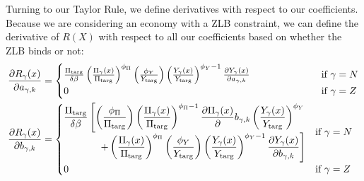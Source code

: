 \documentclass[11pt]{article}
\begin{document}
Turning to our Taylor Rule, we define derivatives with respect to our coefficients. Because we are considering an economy with a ZLB constraint, we can define the derivative of $R(X)$ with respect to all our coefficients based on whether the ZLB binds or not:
\begin{align}
\frac{\partial R_{\gamma}(x)}{\partial a_{\gamma,k}} &=
\begin{cases}
\frac{\Pi_{\text{targ}}}{\delta\beta}\left(\frac{\Pi_{\gamma}(x)}{\Pi_{\text{targ}}}\right)^{\phi_{\Pi}}\left(\frac{\phi_Y}{Y_{\text{targ}}}\right)\left(\frac{Y_{\gamma}(x)}{Y_{\text{targ}}}\right)^{\phi_{Y}-1}\frac{\partial Y_{\gamma}(x)}{\partial a_{\gamma,k}}  & \hspace{2.2cm} \text{if } \gamma = N\\
0  & \hspace{2.2cm} \text{if } \gamma = Z
\end{cases}\\
\frac{\partial R_{\gamma}(x)}{\partial b_{\gamma,k}} &= \begin{cases}
\begin{aligned}
\frac{\Pi_{\text{targ}}}{\delta\beta}\left[\left(\frac{\phi_{\Pi}}{\Pi_{\text{targ}}}\right)\left(\frac{\Pi_{\gamma}(x)}{\Pi_{\text{targ}}}\right)^{\phi_{\Pi}-1}\frac{\partial \Pi_{\gamma}(x)}\partial b_{\gamma,k}\left(\frac{Y_{\gamma}(x)}{Y_{\text{targ}}}\right)^{\phi_{Y}} \right. \\
\left. + \left(\frac{\Pi_{\gamma}(x)}{\Pi_{\text{targ}}}\right)^{\phi_{\Pi}}\left(\frac{\phi_Y}{Y_{\text{targ}}}\right)\left(\frac{Y_{\gamma}(x)}{Y_{\text{targ}}}\right)^{\phi_{Y}-1}\frac{\partial Y_{\gamma}(x)}{\partial b_{\gamma,k}}\right]
\end{aligned}
 &\text{if } \gamma = N\\
0  & \text{if } \gamma = Z
\end{cases}
\end{align}
\end{document}
